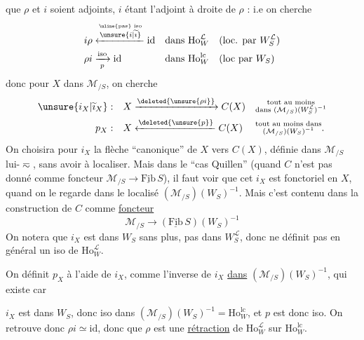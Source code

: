 que $\rho$ et $i$ soient adjoints,  $i$ étant l'adjoint à droite de $\rho$ :
i.e on cherche
\[
\begin{aligned}
i\rho &\xleftarrow{\overset{\text{\uline{pas} iso}}{\unsure{i|\widetilde{\imath}}}}\mathrm{id} &&\text{dans }\mathrm{Ho}^{\mathcal L}_W &&(\text{loc. par }W_S^{\mathcal L})\\
\rho i &\xrightarrow[p]{\mathrm{iso}}\mathrm{id} &&\text{dans }\mathrm{Ho}^{\mathrm{lc}}_W &&(\text{loc par }W_S)
\end{aligned}
\]
donc pour $X$ dans $\mathcal M_{/S}$, on cherche
\[
\begin{aligned}
\unsure{i_X|\widetilde{\imath}_X}:&\quad X\xrightarrow{\deleted{\unsure{\rho i}}} C(X) &&\substack{\text{tout au moins}\\\text{dans }(\mathcal M_{/S})(W_S^{\mathcal L})^{-1}}\\
p_X:&\quad X\xleftarrow{\deleted{\unsure{p}}} C(X) &&\substack{\text{tout au moins dans}\\(\mathcal M_{/S})(W_S)^{-1}}\text{.}
\end{aligned}
\]
On choisira pour $i_X$ la flèche ``canonique'' de $X$ vers $C(X)$, définie dans $\mathcal M_{/S}$ lui-$\eqsim$, sans avoir à localiser. Mais dans le ``cas Quillen'' (quand $C$ n'est pas donné comme foncteur $\mathcal M_{/S}\longrightarrow\underline{\mathrm{Fib}}\,S$), il faut voir que cet $i_X$ est fonctoriel en $X$, quand on le regarde dans le localisé $(\mathcal M_{/S})(W_S)^{-1}$. Mais c'est contenu dans la construction de $C$ comme \uline{foncteur}
\[
\mathcal M_{/S}\longrightarrow(\underline{\mathrm{Fib}}\,S)(W_S)^{-1}
\]
On notera que $i_X$ est dans $W_S$ sans plus, pas dans $W_S^{\mathcal L}$, donc ne définit pas en général un iso de $\mathrm{Ho}^{\mathcal L}_W$.

On définit $p_X$ à l'aide de $i_X$, comme l'inverse de $i_X$ \uline{dans} $(\mathcal M_{/S})(W_S)^{-1}$, qui existe car

$i_X$ est dans $W_S$, donc iso dans $(\mathcal M_{/S})(W_S)^{-1}=\mathrm{Ho}^{\mathrm{lc}}_W$, et $p$ est donc iso. On retrouve donc $\rho i\simeq\mathrm{id}$, donc que $\rho$ est une \uline{rétraction} de $\mathrm{Ho}^{\mathcal L}_W$ sur $\mathrm{Ho}^{\mathrm{lc}}_W$.

